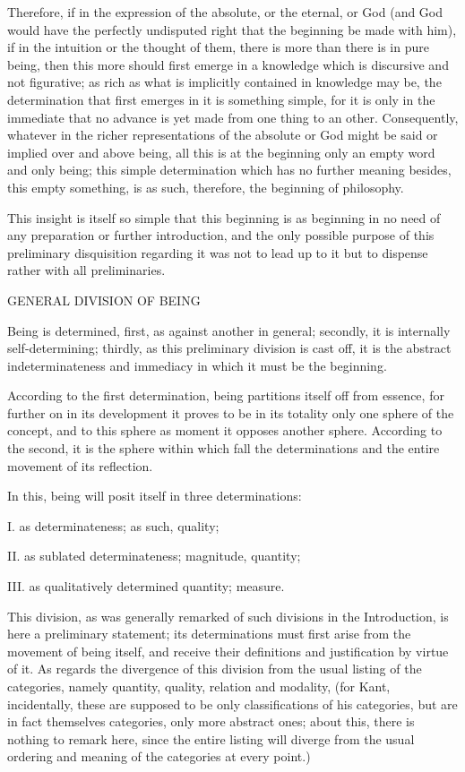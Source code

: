 Therefore, if in the expression of the absolute,
or the eternal, or God
(and God would have the perfectly undisputed right
that the beginning be made with him),
if in the intuition or the thought of them,
there is more than there is in pure being,
then this more should first emerge in a knowledge
which is discursive and not figurative;
as rich as what is implicitly contained in knowledge may be,
the determination that first emerges in it is something simple,
for it is only in the immediate that no advance is
yet made from one thing to an other.
Consequently, whatever in the richer
representations of the absolute or God
might be said or implied over and above being,
all this is at the beginning
only an empty word and only being;
this simple determination which has no further meaning
besides, this empty something, is as such, therefore,
the beginning of philosophy.

This insight is itself so simple
that this beginning is as beginning
in no need of any preparation or further introduction,
and the only possible purpose of
this preliminary disquisition regarding it
was not to lead up to it
but to dispense rather with all preliminaries.

GENERAL DIVISION OF BEING

Being is determined, first, as against another in general;
secondly, it is internally self-determining;
thirdly, as this preliminary division is cast off,
it is the abstract indeterminateness and immediacy
in which it must be the beginning.

According to the first determination,
being partitions itself off from essence,
for further on in its development it proves to be
in its totality only one sphere of the concept,
and to this sphere as moment it opposes another sphere.
According to the second, it is the sphere
within which fall the determinations
and the entire movement of its reflection.

In this, being will posit itself in three determinations:

I. as determinateness; as such, quality;

II. as sublated determinateness; magnitude, quantity;

III. as qualitatively determined quantity; measure.

This division, as was generally remarked of
such divisions in the Introduction,
is here a preliminary statement;
its determinations must first arise
from the movement of being itself,
and receive their definitions and justification by virtue of it.
As regards the divergence of this division from
the usual listing of the categories,
namely quantity, quality, relation and modality,
(for Kant, incidentally, these are supposed to be
only classifications of his categories,
but are in fact themselves categories,
only more abstract ones;
about this, there is nothing to remark here,
since the entire listing will diverge from
the usual ordering and meaning of
the categories at every point.)


